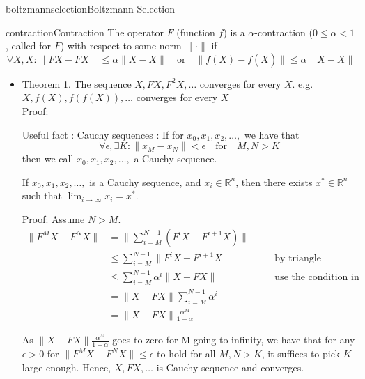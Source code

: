 \documentclass[9pt]{article}
\begin{document}
\begin{topic}{boltzmannselection}{Boltzmann Selection}
\Working
\end{topic}

\begin{topic}{contraction}{Contraction}  The operator $F$ (function $f$) is a $\alpha$-contraction  ($0\le\alpha<1$, called  for $F$) with respect to some norm $\|\cdot\|$ if
\begin{displaymath}
  \forall X,\overline{X}: \|FX-F\overline{X}\| \le \alpha \|X-\overline{X}\| \quad \text{or} \quad \|f(X)-f(\overline{X})\| \le \alpha \|X-\overline{X}\|
\end{displaymath}

\begin{itemize}
\item Theorem 1. The sequence $X, FX, F^2X, \ldots$ converges for every $X$.  e.g. $X, f(X), f(f(X)), \ldots$ converges for every $X$\\

Proof:

Useful fact : Cauchy sequences : If for $x_0,x_1,x_2,\ldots,$ we have that
\begin{displaymath}
  \forall \epsilon, \exists K : \|x_M-x_N \| < \epsilon \quad \text{for} \quad M,N > K
\end{displaymath}
then we call $x_0,x_1,x_2,\ldots,$ a Cauchy sequence.

If $x_0,x_1,x_2,\ldots,$ is a Cauchy sequence, and $x_i \in \mathbb{R}^n$, then there exists $x^* \in \mathbb{R}^n$ such that $\lim_{i \to \infty}x_i = x^*$.

Proof:
Assume $N > M$.
\begin{displaymath}
  \begin{alignedat}{2} %
  \| F^MX-F^NX \| & = \| \sum_{i=M}^{N-1}(F^iX-F^{i+1}X)\| & &\\
  & \le \sum_{i=M}^{N-1} \| F^iX-F^{i+1}X \|  & &\quad \text{by triangle inequality}\\
  & \le \sum_{i=M}^{N-1} \alpha ^{i} \| X-FX\|  & &\quad \text{use the condition in Theorem}\\
  & = \| X-FX \| \sum_{i=M}^{N-1}\alpha^i & &\\
  & = \| X-FX \| \frac{\alpha^M}{1-\alpha} & &
  \end{alignedat}
\end{displaymath}

As $\| X-FX \| \frac{\alpha^M}{1-\alpha}$ goes to zero for M going to infinity, we have that for any $\epsilon > 0$ for $\|F^MX-F^NX\| \le \epsilon$ to hold for all $M,N>K$, it suffices to pick $K$ large enough. Hence, $X,FX,\ldots$ is Cauchy sequence and converges.


\end{itemize}
\end{topic}
\end{document}
